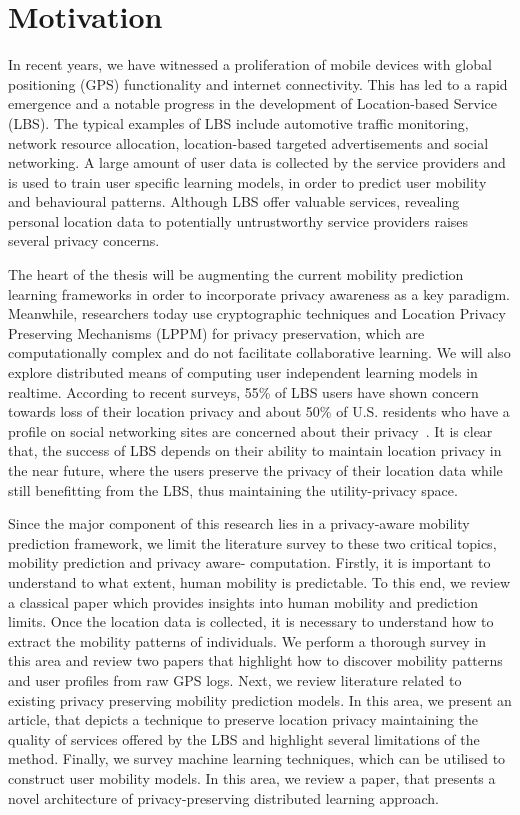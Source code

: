 \newpage
\section*{Motivation} \label{motivation}
In recent years, we have witnessed a proliferation of mobile devices with global positioning 
(GPS) functionality and internet connectivity. This has led to a rapid emergence and a notable 
progress in the development of Location-based Service (LBS). The typical examples of LBS
include automotive traffic monitoring, network resource allocation, location-based 
targeted advertisements and social networking. A large amount of user data is collected by the 
service providers and is used to train user specific learning models, in order to predict user 
mobility and behavioural patterns. Although LBS offer valuable services, revealing personal location 
data to potentially untrustworthy service providers raises several privacy concerns.\newline

The heart of the thesis will be augmenting the current mobility prediction learning frameworks in order
to incorporate privacy awareness as a key paradigm. Meanwhile, researchers today use cryptographic
techniques and Location Privacy Preserving Mechanisms (LPPM) for privacy preservation, which are 
computationally complex and do not facilitate collaborative learning. We will also explore 
distributed means of computing user independent learning models in realtime. According to recent 
surveys, 55\% of LBS users have shown concern towards loss of their location privacy and about 50\% of 
U.S. residents who have a profile on social networking sites are concerned about their privacy~\cite{4511454}. 
It is clear that, the success of LBS depends on their ability to maintain location privacy in the near future,
where the users preserve the privacy of their location data while still benefitting from the LBS, thus 
maintaining the utility-privacy space.\newline

Since the major component of this research lies in a privacy-aware mobility prediction framework, we
limit the literature survey to these two critical topics, mobility prediction and privacy aware- 
computation. Firstly, it is important to understand to what extent, human mobility is predictable. 
To this end, we review a classical paper which provides insights into human mobility and
prediction limits. Once the location data is collected, it is necessary to understand how to extract 
the mobility patterns of individuals. We perform a thorough survey in this area and review two
papers that highlight how to discover mobility patterns and user profiles from raw GPS logs. Next, 
we review literature related to existing privacy preserving mobility prediction models. In this
area, we present an article, that depicts a technique to preserve location privacy maintaining the 
quality of services offered by the LBS and highlight several limitations of the method. 
Finally, we survey machine learning techniques, which can be utilised to construct user mobility 
models. In this area, we review a paper, that presents a novel architecture of privacy-preserving 
distributed learning approach.  



